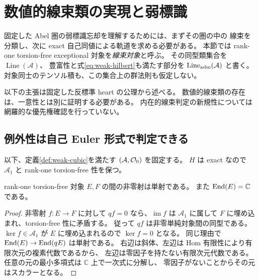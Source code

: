 \section{数値的線束類の実現と弱標識}\label{sec:line-classification}
固定した Abel 圏の弱標識忘却を理解するためには、まずその圏の中の
線束を分類し、次に exact 自己同値による軌道を求める必要がある。
本節では rank-one torsion-free exceptional 対象を\emph{線束対象}と呼ぶ。
その同型類集合を $\operatorname{Line}(\mathcal A)$、
豊富性と式\eqref{eq:weak-hilbert}も満たす部分を
$\operatorname{Line}_{\rm adm}(\mathcal A)$ と書く。
対象同士のテンソル積も、この集合上の群法則も仮定しない。

以下の主張は固定した反標準 heart の公理から述べる。
数値的線束類の存在は、一意性とは別に証明する必要がある。
内在的線束判定の新規性については網羅的な優先権確認を行っていない。

\subsection{例外性は自己 Euler 形式で判定できる}
以下、定義\ref{def:weak-cubic}を満たす $(\mathcal A,\mathcal O_0)$ を固定する。
$H$ は exact なので $\mathcal A_1$ と rank-one torsion-free 性を保つ。

\begin{lemma}[階数一の射]\label{lem:rank-one-monomorphism}
rank-one torsion-free 対象 $E,F$ の間の非零射は単射である。
また $\operatorname{End}(E)=\mathbb C$ である。
\end{lemma}
\begin{proof}
非零射 $f:E\to F$ に対して $qf=0$ なら、$\operatorname{im}f$ は
$\mathcal A_1$ に属して $F$ に埋め込まれ、torsion-free 性に矛盾する。
従って $qf$ は非零単純対象間の同型である。
$\ker f\in\mathcal A_1$ が $E$ に埋め込まれるので $\ker f=0$ となる。
同じ理由で $\operatorname{End}(E)\to\operatorname{End}(qE)$ は単射である。
右辺は斜体、左辺は Hom 有限性により有限次元の複素代数であるから、
左辺は零因子を持たない有限次元代数である。
任意の元の最小多項式は $\mathbb C$ 上で一次式に分解し、
零因子がないことからその元はスカラーとなる。
\end{proof}

